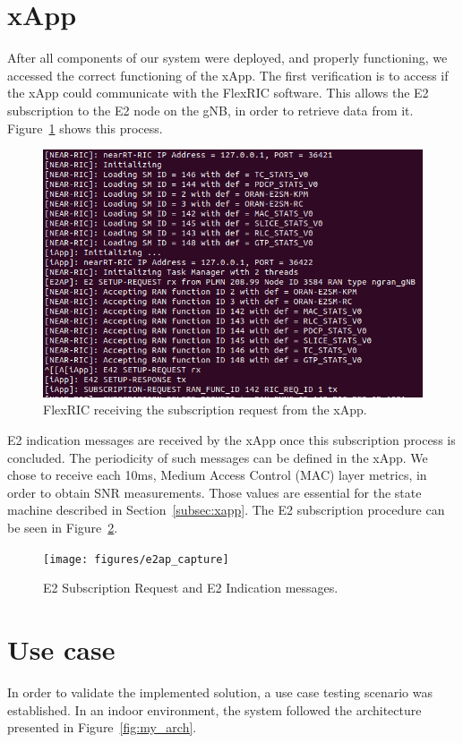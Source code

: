 \section{xApp}\label{sec:mm_xapp}
After all components of our system were deployed, and properly functioning, we accessed the correct functioning of the xApp.
The first verification is to access if the xApp could communicate with the FlexRIC software.
This allows the E2 subscription to the E2 node on the gNB, in order to retrieve data from it.
Figure~\ref{fig:xapp_subscription} shows this process.

\begin{figure}[H]
    \centering
    \includegraphics[width=0.5\linewidth]{figures/xapp_subscription}
    \caption{FlexRIC receiving the subscription request from the xApp.}
    \label{fig:xapp_subscription}
\end{figure}

E2 indication messages are received by the xApp once this subscription process is concluded.
The periodicity of such messages can be defined in the xApp.
We chose to receive each 10ms, Medium Access Control (MAC) layer metrics, in order to obtain SNR measurements.
Those values are essential for the state machine described in Section~\ref{subsec:xapp}.
The E2 subscription procedure can be seen in Figure~\ref{fig:captura_e2ap}.

\begin{figure}[H]
    \centering
    \texttt{[image: figures/e2ap\_capture]}
    \caption{E2 Subscription Request and E2 Indication messages.}
    \label{fig:captura_e2ap}
\end{figure}

\section{Use case}\label{sec:use_case}
In order to validate the implemented solution, a use case testing scenario was established.
In an indoor environment, the system followed the architecture presented in Figure~\ref{fig:my_arch}.

